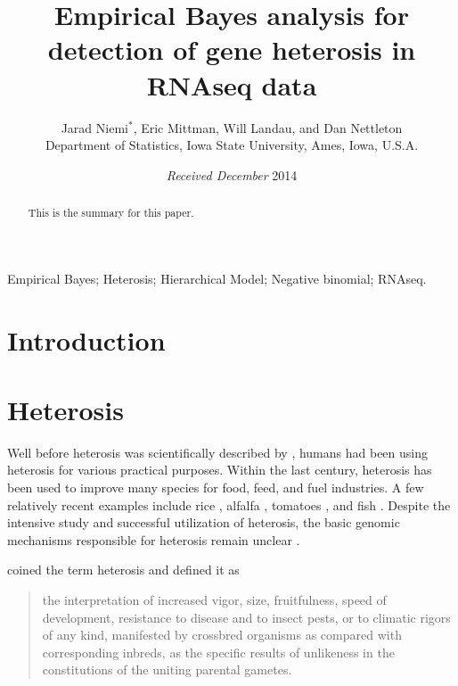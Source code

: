 \documentclass[useAMS,usenatbib,referee]{biom}
\title{Empirical Bayes analysis for detection of gene heterosis in RNAseq data}
\author{Jarad Niemi$^*$\email{niemi@iastate.edu}, 
Eric Mittman, 
Will Landau, and 
Dan Nettleton \\
Department of Statistics, Iowa State University, Ames, Iowa, U.S.A.}
\begin{document}
\date{{\it Received December} 2014} 

\pagerange{\pageref{firstpage}--\pageref{lastpage}} 

\label{firstpage}


\begin{abstract}
This is the summary for this paper.
\end{abstract}

\begin{keywords}
Empirical Bayes; Heterosis; Hierarchical Model; Negative binomial; RNAseq.
\end{keywords}

\maketitle


\section{Introduction}
\label{s:intro}

\section{Heterosis}
\label{s:heterosis}

Well before heterosis was scientifically described by \cite{darwin1876effects}, humans had been using heterosis for various practical purposes. Within the last century, heterosis has been used to improve many species for food, feed, and fuel industries. A few relatively recent examples include rice \cite{yu1997importance}, alfalfa \cite{riday2002heterosis}, tomatoes \cite{krieger2010flowering}, and fish \cite{wohlfarth1993heterosis}. Despite the intensive study and successful utilization of heterosis, the basic genomic mechanisms responsible for heterosis remain unclear \cite{lippman2007heterosis}.

\cite{shull1952beginnings} coined the term heterosis and defined it as 
\begin{quote}
the interpretation of increased vigor, size, fruitfulness, speed of development, resistance to disease and to insect pests, or to climatic rigors of any kind, manifested by crossbred organisms as compared with corresponding inbreds, as the specific results of unlikeness in the constitutions of the uniting parental gametes.
\end{quote}
\end{document}
